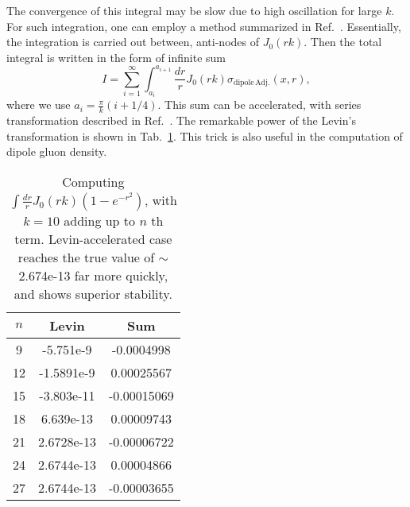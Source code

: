 \documentclass{article}
\newcommand{\sdpa}[0]{\sigma_{\mathrm{dipole\,Adj.}}}
\begin{document}
The convergence of this integral may be slow due to high oscillation for large $k$.
For such integration, one can employ a method summarized in Ref.~\cite{LYNESS1985109}. 
Essentially, the integration is carried out between, anti-nodes of $J_0(rk)$. Then the total integral is written in the form of infinite sum
\begin{equation}
	I=\sum^\infty_{i=1} \int^{a_{i+1}}_{a_i} \frac{dr}{r}J_0(r k) \sdpa(x,r),
\end{equation}
where we use $a_{i}=\frac{\pi}{k}(i+1/4)$.
This sum can be accelerated, with series transformation described in Ref.~\cite{doi:10.1080/00207167308803075,Weniger:1989rea,HOMEIER19951}.
The remarkable power of the Levin's transformation is shown in Tab.~\ref{tab:levin}.
This trick is also useful in the computation of dipole gluon density. 

\begin{table}
	\begin{center}
	\begin{tabular}{|c||c|c|}
		\hline
		$n$&Levin&Sum\\\hline
		9&	-5.751e-9&	-0.0004998\\\hline
		12&	-1.5891e-9&	0.00025567\\\hline
		15&	-3.803e-11&	-0.00015069\\\hline
		18&	6.639e-13&	0.00009743\\\hline
		21&	2.6728e-13&	-0.00006722\\\hline
		24&	2.6744e-13&	0.00004866\\\hline
		27&	2.6744e-13&	-0.00003655\\\hline
	\end{tabular}
	\end{center}
	\caption{
		Computing $\int \frac{dr}{r}J_0(r k)(1-e^{-r^2})$, with $k=10$ adding up to $n$ th term.
		Levin-accelerated case reaches the true value of $\sim$2.674e-13 far more quickly, and shows superior stability.
	}
\label{tab:levin}
\end{table}
\printbibliography
\end{document}
